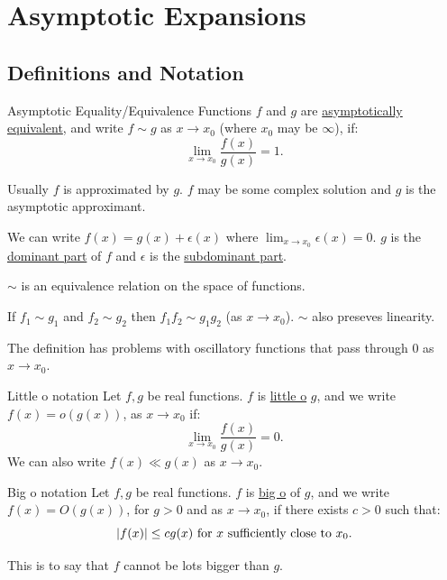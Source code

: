 \documentclass[../Main.tex]{subfiles}
\begin{document}
\section{Asymptotic Expansions}
\subsection{Definitions and Notation}
\begin{definition}{Asymptotic Equality/Equivalence}
    Functions $f$ and $g$ are \underline{asymptotically equivalent}, and write $f \sim g$ as $x \to x_0$ (where $x_0$ may be $\infty$), if:
    \begin{equation*}
        \lim_{x \to x_0} \frac{f(x)}{g(x)} = 1.
    \end{equation*}
\end{definition}
\begin{remarks}
    \item Usually $f$ is approximated by $g$. $f$ may be some complex solution and $g$ is the asymptotic approximant.
    \item We can write $f(x) = g(x) + \epsilon(x)$ where $\lim_{x \to x_0} \epsilon(x) = 0$. $g$ is the \underline{dominant part} of $f$ and $\epsilon$ is the \underline{subdominant part}.
    \item $\sim$ is an equivalence relation on the space of functions.
    \item If $f_1 \sim g_1$ and $f_2 \sim g_2$ then $f_1 f_2 \sim g_1 g_2$ (as $x \to x_0$). $\sim$ also preseves linearity.
    \item The definition has problems with oscillatory functions that pass through $0$ as $x \to x_0$.
\end{remarks}
\begin{definition}{Little o notation}
    Let $f, g$ be real functions. $f$ is \underline{little o} $g$, and we write $f(x) = o(g(x))$, as $x \to x_0$ if:
    \begin{equation*}
        \lim_{x \to x_0} \frac{f(x)}{g(x)} = 0.
    \end{equation*}
    We can also write $f(x) \ll g(x)$ as $x \to x_0$.
\end{definition}
\begin{definition}{Big o notation}
    Let $f, g$ be real functions. $f$ is \underline{big o} of $g$, and we write $f(x) = O(g(x))$, for $g > 0$ and as $x \to x_0$, if there exists $c > 0$ such that:
    \begin{equation*}
        \left|f(x)\right| \leq cg(x)~\text{for $x$ sufficiently close to $x_0$.}
    \end{equation*}
\end{definition}
\begin{remark}
    This is to say that $f$ cannot be lots bigger than $g$.
\end{remark}
\end{document}
